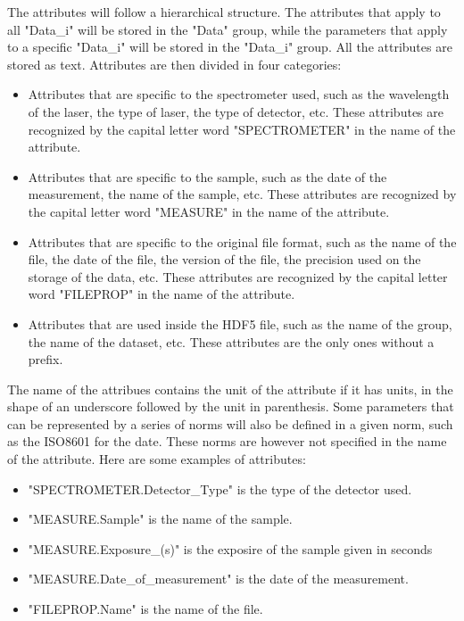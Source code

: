 \documentclass{article}
\begin{document}
        The attributes will follow a hierarchical structure. The attributes that apply to all "Data\_i" will be stored in the "Data" group, while the parameters that apply to a specific "Data\_i" will be stored in the "Data\_i" group. All the attributes are stored as text. Attributes are then divided in four categories:
        \begin{itemize}
            \item Attributes that are specific to the spectrometer used, such as the wavelength of the laser, the type of laser, the type of detector, etc. These attributes are recognized by the capital letter word "SPECTROMETER" in the name of the attribute.
            \item Attributes that are specific to the sample, such as the date of the measurement, the name of the sample, etc. These attributes are recognized by the capital letter word "MEASURE" in the name of the attribute.
            \item Attributes that are specific to the original file format, such as the name of the file, the date of the file, the version of the file, the precision used on the storage of the data, etc. These attributes are recognized by the capital letter word "FILEPROP" in the name of the attribute.
            \item Attributes that are used inside the HDF5 file, such as the name of the group, the name of the dataset, etc. These attributes are the only ones without a prefix.
        \end{itemize}

        The name of the attribues contains the unit of the attribute if it has units, in the shape of an underscore followed by the unit in parenthesis. Some parameters that can be represented by a series of norms will also be defined in a given norm, such as the ISO8601 for the date. These norms are however not specified in the name of the attribute. Here are some examples of attributes:
        \begin{itemize}
            \item "SPECTROMETER.Detector\_Type" is the type of the detector used.
            \item "MEASURE.Sample" is the name of the sample.
            \item "MEASURE.Exposure\_(s)" is the exposire of the sample given in seconds
            \item "MEASURE.Date\_of\_measurement" is the date of the measurement. 
            \item "FILEPROP.Name" is the name of the file.
        \end{itemize}
\end{document}
